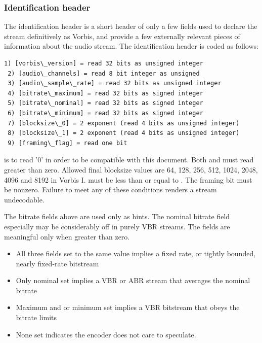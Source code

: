 \subsubsection{Identification header}

The identification header is a short header of only a few fields used
to declare the stream definitively as Vorbis, and provide a few externally
relevant pieces of information about the audio stream. The
identification header is coded as follows:

\begin{Verbatim}[commandchars=\\\{\}]
 1) [vorbis\_version] = read 32 bits as unsigned integer
 2) [audio\_channels] = read 8 bit integer as unsigned
 3) [audio\_sample\_rate] = read 32 bits as unsigned integer
 4) [bitrate\_maximum] = read 32 bits as signed integer
 5) [bitrate\_nominal] = read 32 bits as signed integer
 6) [bitrate\_minimum] = read 32 bits as signed integer
 7) [blocksize\_0] = 2 exponent (read 4 bits as unsigned integer)
 8) [blocksize\_1] = 2 exponent (read 4 bits as unsigned integer)
 9) [framing\_flag] = read one bit
\end{Verbatim}

 is to read '0' in order to be compatible
with this document.  Both  and
 must read greater than zero.  Allowed final
blocksize values are 64, 128, 256, 512, 1024, 2048, 4096 and 8192 in
Vorbis I.  \varname{[blocksize\_0]} must be less than or equal to
\varname{[blocksize\_1]}.  The framing bit must be nonzero.  Failure to
meet any of these conditions renders a stream undecodable.

The bitrate fields above are used only as hints. The nominal bitrate
field especially may be considerably off in purely VBR streams.  The
fields are meaningful only when greater than zero.

\begin{itemize}
  \item All three fields set to the same value implies a fixed rate, or tightly bounded, nearly fixed-rate bitstream
  \item Only nominal set implies a VBR or ABR stream that averages the nominal bitrate
  \item Maximum and or minimum set implies a VBR bitstream that obeys the bitrate limits
  \item None set indicates the encoder does not care to speculate.
\end{itemize}




